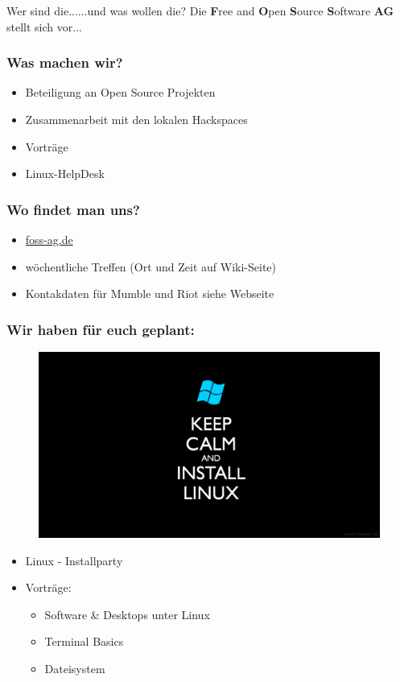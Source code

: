 \begin{frame}{Wer sind die...}{...und was wollen die?}
	Die \textbf{F}ree and \textbf{O}pen \textbf{S}ource \textbf{S}oftware \textbf{AG} stellt sich vor... 
\end{frame}

\begin{frame}
\frametitle{Was machen wir?}
\begin{itemize}
	\item Beteiligung an Open Source Projekten
	\item Zusammenarbeit mit den lokalen Hackspaces
	\item Vorträge
	\item Linux-HelpDesk
\end{itemize}
\end{frame}

\begin{frame}
\frametitle{Wo findet man uns?}
\begin{itemize}
	\item \href{https://foss-ag.de}{foss-ag.de}
	\item wöchentliche Treffen (Ort und Zeit auf Wiki-Seite)
	\item Kontakdaten für Mumble und Riot siehe Webseite
\end{itemize}
\end{frame}

\begin{frame}
\frametitle{Wir haben für euch geplant:}
\begin{figure}
\includegraphics[scale=0.1]{resources/linuxcalm.png}
\end{figure}
\begin{itemize}
	\item Linux - Installparty
	\item Vorträge:
	\begin{itemize}
		\item Software \& Desktops unter Linux
		\item Terminal Basics
		\item Dateisystem
	\end{itemize}
\end{itemize}
\end{frame}

